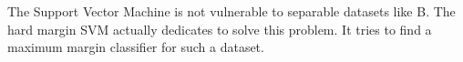 \begin{answer}
The Support Vector Machine is not vulnerable to separable datasets like B. The 
hard margin SVM actually dedicates to solve this problem. It tries to find 
a maximum margin classifier for such a dataset. \\
\end{answer}
